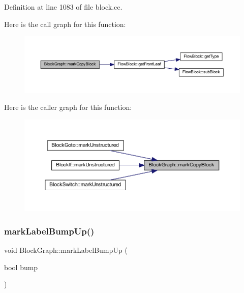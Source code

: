 Definition at line 1083 of file block.\+cc.

Here is the call graph for this function\+:
\nopagebreak
\begin{figure}[H]
\begin{center}
\leavevmode
\includegraphics[width=350pt]{class_block_graph_ad522a7201e4327411cd161b04d57f1da_cgraph}
\end{center}
\end{figure}
Here is the caller graph for this function\+:
\nopagebreak
\begin{figure}[H]
\begin{center}
\leavevmode
\includegraphics[width=350pt]{class_block_graph_ad522a7201e4327411cd161b04d57f1da_icgraph}
\end{center}
\end{figure}
\mbox{\label{class_block_graph_a67e2a75a80e60655a9936045d40983f6}} 
\subsubsection{\texorpdfstring{markLabelBumpUp()}{markLabelBumpUp()}}
{\footnotesize\ttfamily void Block\+Graph\+::mark\+Label\+Bump\+Up (\begin{DoxyParamCaption}\item[{bool}]{bump }\end{DoxyParamCaption})\hspace{0.3cm}{\ttfamily [virtual]}}



